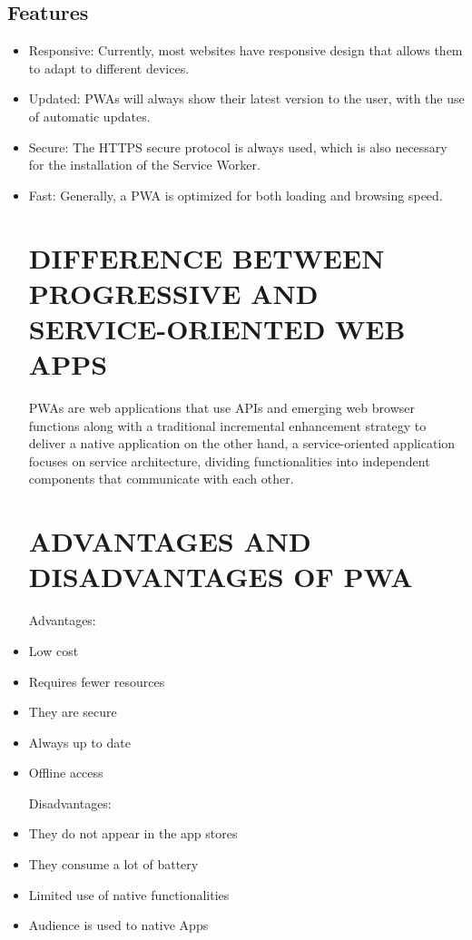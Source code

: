 \documentclass{article}
\begin{document}
\subsection{Features}
\begin{itemize}


\item Responsive:
Currently, most websites have responsive design that allows them to adapt to different devices.

\item Updated:
PWAs will always show their latest version to the user, with the use of automatic updates. 

\item Secure:
The HTTPS secure protocol is always used, which is also necessary for the installation of the Service Worker. 

\item Fast:
Generally, a PWA is optimized for both loading and browsing speed. 


\section{DIFFERENCE BETWEEN PROGRESSIVE AND SERVICE-ORIENTED WEB APPS }

PWAs are web applications that use APIs and emerging web browser functions along with a traditional incremental enhancement strategy to deliver a native application on the other hand, a service-oriented application focuses on service architecture, dividing functionalities into independent components that communicate with each other. 

\section{ADVANTAGES AND DISADVANTAGES OF PWA}


Advantages:
\item Low cost
\item Requires fewer resources
\item They are secure
\item Always up to date 
\item Offline access 

\vspace{12pt}

Disadvantages:
\item They do not appear in the app stores
\item They consume a lot of battery 
\item Limited use of native functionalities
\item Audience is used to native Apps



\end{itemize}
\end{document}
